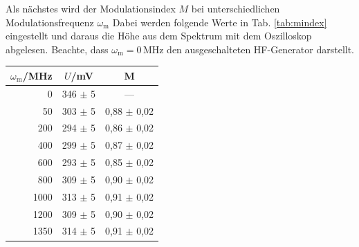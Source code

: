 Als nächstes wird der Modulationsindex $M$ bei unterschiedlichen Modulationsfrequenz $\omega_\mathrm{m}$ Dabei werden folgende Werte in Tab. \ref{tab:mindex} eingestellt und daraus die Höhe aus dem Spektrum mit dem Oszilloskop abgelesen. Beachte, dass $\omega_\mathrm{m} = 0$\,MHz den ausgeschalteten HF-Generator darstellt.

\begin{center}
    \captionsetup{type=table}
    \begin{tabular}{r | c c}
        $\omega_\mathrm{m}$/MHz & $U$/mV & M \\ \hline
        0    & 346 $\pm$ 5 & --- \\
        50   & 303 $\pm$ 5 & 0,88 $\pm$ 0,02 \\
        200  & 294 $\pm$ 5 & 0,86 $\pm$ 0,02 \\
        400  & 299 $\pm$ 5 & 0,87 $\pm$ 0,02 \\
        600  & 293 $\pm$ 5 & 0,85 $\pm$ 0,02 \\
        800  & 309 $\pm$ 5 & 0,90 $\pm$ 0,02 \\
        1000 & 313 $\pm$ 5 & 0,91 $\pm$ 0,02 \\
        1200 & 309 $\pm$ 5 & 0,90 $\pm$ 0,02 \\
        1350 & 314 $\pm$ 5 & 0,91 $\pm$ 0,02 \\
    \end{tabular}
    \label{tab:mindex}
\end{center}

